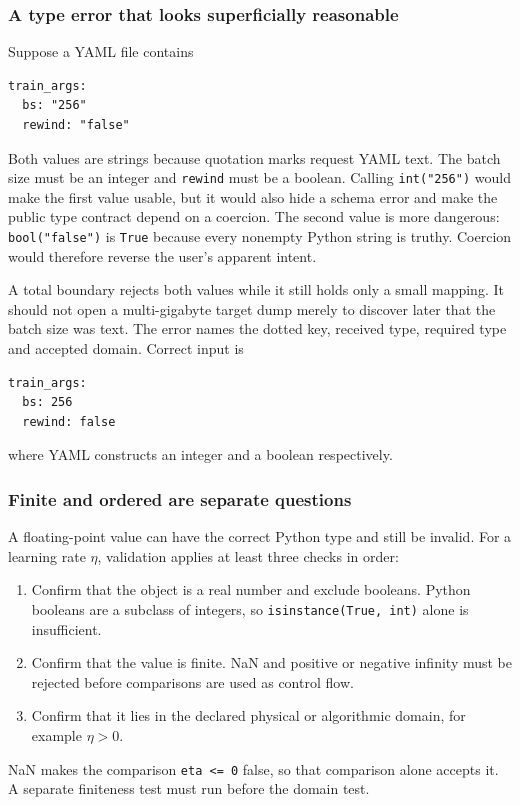 \documentclass[10pt,aps,prd,twocolumn,nofootinbib]{revtex4-2}
\newcommand{\code}[1]{\texttt{#1}}
\begin{document}
\subsubsection{A type error that looks superficially reasonable}

Suppose a YAML file contains
\begin{verbatim}
train_args:
  bs: "256"
  rewind: "false"
\end{verbatim}
Both values are strings because quotation marks request YAML text.  The batch
size must be an integer and \code{rewind} must be a boolean.  Calling
\code{int("256")} would make the first value usable, but it would also hide a
schema error and make the public type contract depend on a coercion.  The
second value is more dangerous: \code{bool("false")} is \code{True} because
every nonempty Python string is truthy.  Coercion would therefore reverse the
user's apparent intent.

A total boundary rejects both values while it still holds only a small
mapping.  It should not open a multi-gigabyte target dump merely to discover
later that the batch size was text.  The error names the dotted key, received
type, required type and accepted domain.  Correct input is
\begin{verbatim}
train_args:
  bs: 256
  rewind: false
\end{verbatim}
where YAML constructs an integer and a boolean respectively.

\subsubsection{Finite and ordered are separate questions}

A floating-point value can have the correct Python type and still be invalid.
For a learning rate $\eta$, validation applies at least three checks in
order:
\begin{enumerate}
  \item Confirm that the object is a real number and exclude booleans.  Python
        booleans are a subclass of integers, so
        \code{isinstance(True, int)} alone is insufficient.
  \item Confirm that the value is finite.  NaN and positive or negative infinity must be
        rejected before comparisons are used as control flow.
  \item Confirm that it lies in the declared physical or algorithmic domain,
        for example $\eta>0$.
\end{enumerate}
NaN makes the comparison \code{eta <= 0} false, so that comparison alone
accepts it.  A separate finiteness test must run before the domain test.
\end{document}
